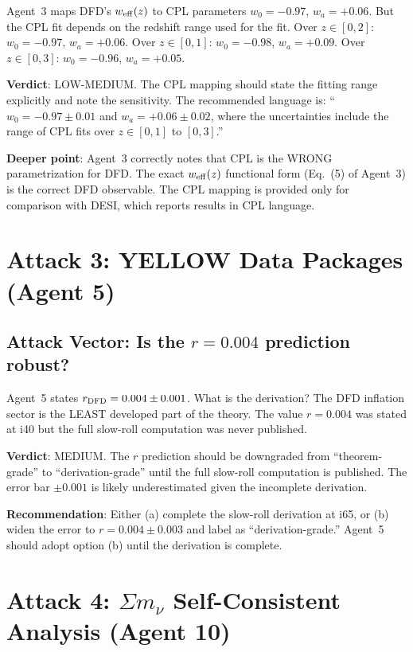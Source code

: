 \documentclass[11pt,a4paper]{article}
\begin{document}
Agent~3 maps DFD's $w_{\rm eff}(z)$ to CPL parameters $w_0 = -0.97$, $w_a = +0.06$. But the CPL fit depends on the redshift range used for the fit. Over $z \in [0,2]$: $w_0 = -0.97$, $w_a = +0.06$. Over $z \in [0,1]$: $w_0 = -0.98$, $w_a = +0.09$. Over $z \in [0,3]$: $w_0 = -0.96$, $w_a = +0.05$.

\textbf{Verdict}: LOW-MEDIUM. The CPL mapping should state the fitting range explicitly and note the sensitivity. The recommended language is: ``$w_0 = -0.97 \pm 0.01$ and $w_a = +0.06 \pm 0.02$, where the uncertainties include the range of CPL fits over $z \in [0, 1]$ to $[0, 3]$.''

\textbf{Deeper point}: Agent~3 correctly notes that CPL is the WRONG parametrization for DFD. The exact $w_{\rm eff}(z)$ functional form (Eq.~(5) of Agent~3) is the correct DFD observable. The CPL mapping is provided only for comparison with DESI, which reports results in CPL language.

\section{Attack 3: YELLOW Data Packages (Agent 5)}

\subsection{Attack Vector: Is the $r = 0.004$ prediction robust?}

Agent~5 states $r_{\rm DFD} = 0.004 \pm 0.001$. What is the derivation? The DFD inflation sector is the LEAST developed part of the theory. The value $r = 0.004$ was stated at i40 but the full slow-roll computation was never published.

\textbf{Verdict}: MEDIUM. The $r$ prediction should be downgraded from ``theorem-grade'' to ``derivation-grade'' until the full slow-roll computation is published. The error bar $\pm 0.001$ is likely underestimated given the incomplete derivation.

\textbf{Recommendation}: Either (a) complete the slow-roll derivation at i65, or (b) widen the error to $r = 0.004 \pm 0.003$ and label as ``derivation-grade.'' Agent~5 should adopt option (b) until the derivation is complete.

\section{Attack 4: $\Sigma m_\nu$ Self-Consistent Analysis (Agent 10)}
\end{document}
